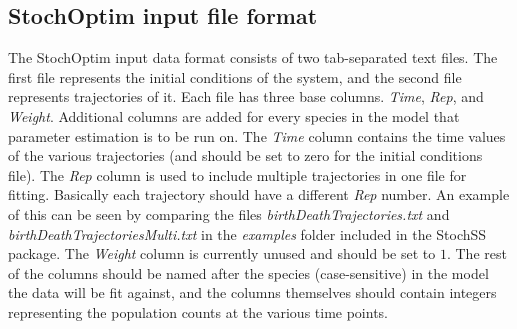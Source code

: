 \subsection{StochOptim input file format}
The StochOptim input data format consists of two tab-separated text files.
The first file represents the initial conditions of the system, and the second file represents trajectories of it.
Each file has three base columns. \textit{Time}, \textit{Rep}, and \textit{Weight}. Additional columns are added for every species in the model that parameter estimation is to be run on. The \textit{Time} column contains the time values of the various trajectories (and should be set to zero for the initial conditions file). The \textit{Rep} column is used to include multiple trajectories in one file for fitting. Basically each trajectory should have a different \textit{Rep} number. An example of this can be seen by comparing the files \textit{birthDeathTrajectories.txt} and \textit{birthDeathTrajectoriesMulti.txt} in the \textit{examples} folder included in the StochSS package. The \textit{Weight} column is currently unused and should be set to $1$. The rest of the columns should be named after the species (case-sensitive) in the model the data will be fit against, and the columns themselves should contain integers representing the population counts at the various time points.


